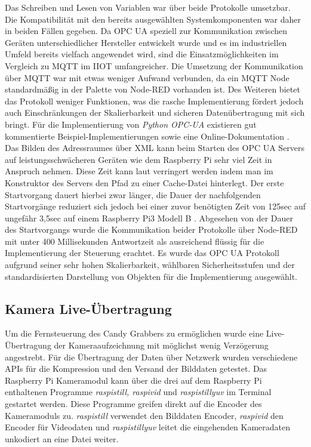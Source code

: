 \documentclass[BMR,Bachelor,ngerman]{twbook}%
\begin{document}
\par Das Schreiben und Lesen von Variablen war über beide Protokolle umsetzbar. Die Kompatibilität mit den bereits ausgewählten Systemkomponenten war daher in beiden Fällen gegeben. Da \ac{OPC UA} speziell zur Kommunikation zwischen Geräten unterschiedlicher Hersteller entwickelt wurde und es im industriellen Umfeld bereits vielfach angewendet wird, sind die Einsatzmöglichkeiten im Vergleich zu \ac{MQTT} im \ac{IIOT} umfangreicher. Die Umsetzung der Kommunikation über \ac{MQTT} war mit etwas weniger Aufwand verbunden, da ein \ac{MQTT} Node standardmäßig in der Palette von Node-RED vorhanden ist. Des Weiteren bietet das Protokoll weniger Funktionen, was die rasche Implementierung fördert jedoch auch Einschränkungen der Skalierbarkeit und sicheren Datenübertragung mit sich bringt. Für die Implementierung von \emph{Python OPC-UA} existieren gut kommentierte Beispiel-Implementierungen \cite{pythonopcua2018} sowie eine Online-Dokumentation \cite{doku2015pyopcua}. Das Bilden des Adressraumes über \ac{XML} kann beim Starten des \ac{OPC UA} Servers auf leistungsschwächeren Geräten wie dem Raspberry Pi sehr viel Zeit in Anspruch nehmen. Diese Zeit kann laut  verringert werden indem man im Konstruktor des Servers den Pfad zu einer Cache-Datei hinterlegt. Der erste Startvorgang dauert hierbei zwar länger, die Dauer der nachfolgenden Startvorgänge reduziert sich jedoch bei einer zuvor benötigten Zeit von 125sec auf ungefähr 3,5sec auf einem Raspberry Pi3 Modell B \cite{pythonopcua2018}. Abgesehen von der Dauer des Startvorgangs wurde die Kommunikation beider Protokolle über Node-RED mit unter 400 Millisekunden Antwortzeit als ausreichend flüssig für die Implementierung der Steuerung erachtet. Es wurde das \ac{OPC UA} Protokoll aufgrund seiner sehr hohen Skalierbarkeit, wählbaren Sicherheitsstufen und der standardisierten Darstellung von Objekten für die Implementierung ausgewählt.
\subsection{Kamera Live-Übertragung}
Um die Fernsteuerung des Candy Grabbers zu ermöglichen wurde eine Live-Übertragung der Kameraaufzeichnung mit möglichst wenig Verzögerung angestrebt. Für die Übertragung der Daten über Netzwerk wurden verschiedene \acp{API} für die Kompression und den Versand der Bilddaten getestet. Das Raspberry Pi Kameramodul kann über die drei auf dem Raspberry Pi enthaltenen Programme \emph{raspistill, raspivid} und \emph{raspistillyuv} im Terminal gestartet werden. Diese Programme greifen direkt auf die Encoder des Kameramoduls zu. \emph{raspistill} verwendet den Bilddaten Encoder, \emph{raspivid} den Encoder für Videodaten und \emph{raspistillyuv} leitet die eingehenden Kameradaten unkodiert an eine Datei weiter.
\end{document}
